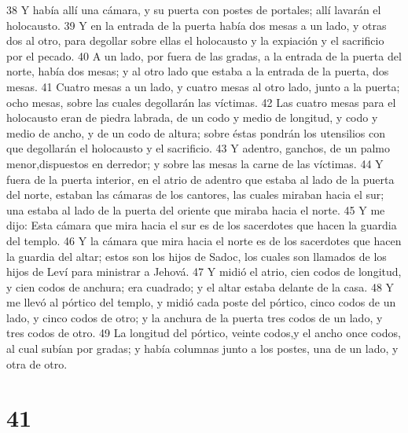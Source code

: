 38 Y había allí una cámara, y su puerta con postes de portales; allí lavarán el holocausto.
39 Y en la entrada de la puerta había dos mesas a un lado, y otras dos al otro, para degollar sobre ellas el holocausto y la expiación y el sacrificio por el pecado.
40 A un lado, por fuera de las gradas, a la entrada de la puerta del norte, había dos mesas; y al otro lado que estaba a la entrada de la puerta, dos mesas.
41 Cuatro mesas a un lado, y cuatro mesas al otro lado, junto a la puerta; ocho mesas, sobre las cuales degollarán las víctimas.
42 Las cuatro mesas para el holocausto eran de piedra labrada, de un codo y medio de longitud, y codo y medio de ancho, y de un codo de altura; sobre éstas pondrán los utensilios con que degollarán el holocausto y el sacrificio. 
43 Y adentro, ganchos, de un palmo menor,dispuestos en derredor; y sobre las mesas la carne de las víctimas.
44 Y fuera de la puerta interior, en el atrio de adentro que estaba al lado de la puerta del norte, estaban las cámaras de los cantores, las cuales miraban hacia el sur; una estaba al lado de la puerta del oriente que miraba hacia el norte.
45 Y me dijo: Esta cámara que mira hacia el sur es de los sacerdotes que hacen la guardia del templo.
46 Y la cámara que mira hacia el norte es de los sacerdotes que hacen la guardia del altar; estos son los hijos de Sadoc, los cuales son llamados de los hijos de Leví para ministrar a Jehová.
47 Y midió el atrio, cien codos de longitud, y cien codos de anchura; era cuadrado; y el altar estaba delante de la casa.
48 Y me llevó al pórtico del templo, y midió cada poste del pórtico, cinco codos de un lado, y cinco codos de otro; y la anchura de la puerta tres codos de un lado, y tres codos de otro.
49 La longitud del pórtico, veinte codos,y el ancho once codos, al cual subían por gradas; y había columnas junto a los postes, una de un lado, y otra de otro.

\chapter{41}

